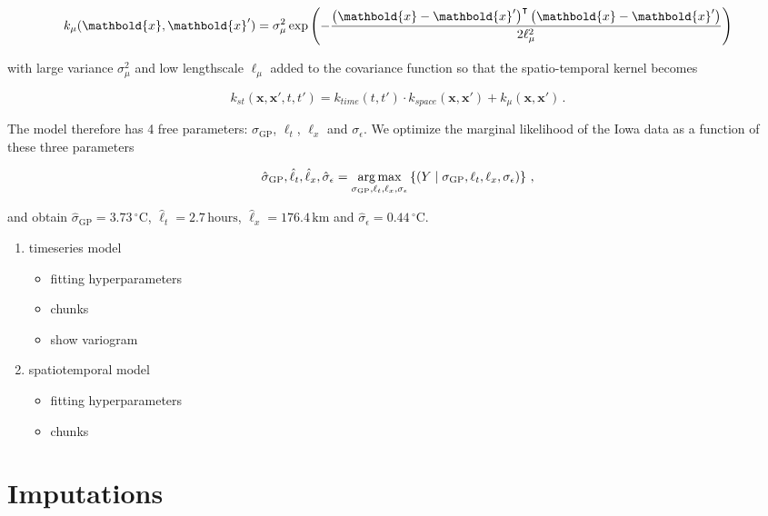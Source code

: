 \documentclass[letter]{article}
\providecommand{\tightlist}{%
      \setlength{\itemsep}{0pt}\setlength{\parskip}{0pt}}
\newcommand{\genericdel}[3]{%
      \left#1#3\right#2
    }
\newcommand{\del}[1]{\genericdel(){#1}}
\newcommand{\cbr}[1]{\genericdel\{\}{#1}}
\DeclareMathOperator*{\argmax}{arg\,max}
\let\Pr\relax
\DeclareMathOperator{\Pr}{\mathbb{P}}
\newcommand{\xvec}{\mathbold{x}}
\newcommand{\trans}{^{\intercal}}
\newcommand{\sigmaf}{\sigma_{\mathrm{GP}}}
\newcommand{\sigman}{\sigma_{\epsilon}}
\newcommand{\degreeC}{^\circ \mathrm{C}}
\providecommand{\tightlist}{%
  	  \setlength{\itemsep}{0pt}\setlength{\parskip}{0pt}}
\begin{document}
\begin{equation}
    k_{\mu}(\xvec, \xvec') = \sigma_\mu^2 \exp\del{-\frac{\del{\xvec-\xvec'}\trans\del{\xvec-\xvec'}}{2\ell_\mu^2}}
\end{equation}

with large variance \(\sigma_\mu^2\) and low lengthscale \(\ell_\mu\)
added to the covariance function so that the spatio-temporal kernel
becomes

\begin{equation}
    k_{st}(\xvec,\xvec',t,t') = k_{time}(t,t') \cdot k_{space}(\xvec, \xvec') + k_\mu(\xvec, \xvec') \,.
\end{equation}

The model therefore has 4 free parameters: \(\sigmaf\), \(\ell_t\),
\(\ell_x\) and \(\sigman\). We optimize the marginal likelihood of the
Iowa data as a function of these three parameters

\begin{equation}
\label{eq:optimization}
\hat\sigmaf,\hat\ell_t,\hat\ell_x,\hat\sigman = \argmax_{\sigmaf,\ell_t,\ell_x,\sigman} \cbr{ \Pr\del{ Y \mid {\sigmaf,\ell_t,\ell_x,\sigman} } }\,,
\end{equation}

and obtain \(\hat\sigmaf=3.73\,\degreeC\),
\(\hat\ell_t=2.7\,\mathrm{hours}\), \(\hat\ell_x=176.4\,\mathrm{km}\)
and \(\hat\sigman=0.44\,\degreeC\).
    


    	\begin{enumerate}
\def\labelenumi{\arabic{enumi}.}
\tightlist
\item
  timeseries model

  \begin{itemize}
  \tightlist
  \item
    fitting hyperparameters
  \item
    chunks
  \item
    show variogram
  \end{itemize}
\item
  spatiotemporal model

  \begin{itemize}
  \tightlist
  \item
    fitting hyperparameters
  \item
    chunks
  \end{itemize}
\end{enumerate}
    


    	\section{Imputations}\label{imputations}
\end{document}
